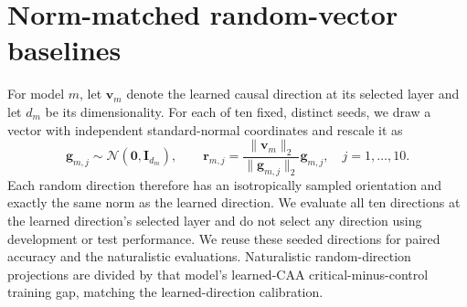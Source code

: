 \section{Norm-matched random-vector baselines}
\label{app:random-baselines}
For model $m$, let $\mathbf{v}_m$ denote the learned causal direction at its selected layer and let $d_m$ be its dimensionality. For each of ten fixed, distinct seeds, we draw a vector with independent standard-normal coordinates and rescale it as
\begin{equation}
\mathbf{g}_{m,j}\sim\mathcal{N}(\mathbf{0},\mathbf{I}_{d_m}),
\qquad
\mathbf{r}_{m,j}
=\frac{\lVert\mathbf{v}_m\rVert_2}{\lVert\mathbf{g}_{m,j}\rVert_2}
\mathbf{g}_{m,j},
\quad j=1,\ldots,10.
\label{eq:random-direction}
\end{equation}
Each random direction therefore has an isotropically sampled orientation and exactly the same norm as the learned direction. We evaluate all ten directions at the learned direction's selected layer and do not select any direction using development or test performance. We reuse these seeded directions for paired accuracy and the naturalistic evaluations. Naturalistic random-direction projections are divided by that model's learned-CAA critical-minus-control training gap, matching the learned-direction calibration.

